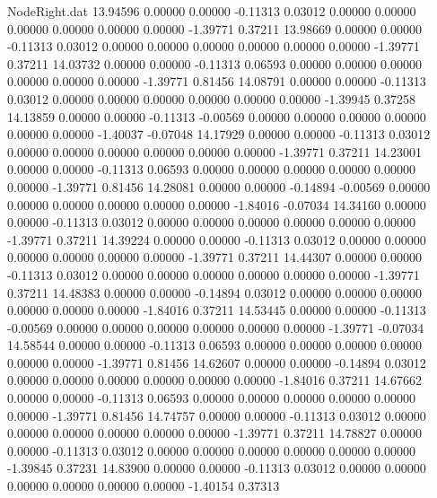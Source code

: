 \begin{filecontents}{NodeRight.dat}
  13.94596    0.00000    0.00000    -0.11313    0.03012    0.00000    0.00000    0.00000    0.00000    0.00000    0.00000   -1.39771    0.37211
  13.98669    0.00000    0.00000    -0.11313    0.03012    0.00000    0.00000    0.00000    0.00000    0.00000    0.00000   -1.39771    0.37211
  14.03732    0.00000    0.00000    -0.11313    0.06593    0.00000    0.00000    0.00000    0.00000    0.00000    0.00000   -1.39771    0.81456
  14.08791    0.00000    0.00000    -0.11313    0.03012    0.00000    0.00000    0.00000    0.00000    0.00000    0.00000   -1.39945    0.37258
  14.13859    0.00000    0.00000    -0.11313   -0.00569    0.00000    0.00000    0.00000    0.00000    0.00000    0.00000   -1.40037   -0.07048
  14.17929    0.00000    0.00000    -0.11313    0.03012    0.00000    0.00000    0.00000    0.00000    0.00000    0.00000   -1.39771    0.37211
  14.23001    0.00000    0.00000    -0.11313    0.06593    0.00000    0.00000    0.00000    0.00000    0.00000    0.00000   -1.39771    0.81456
  14.28081    0.00000    0.00000    -0.14894   -0.00569    0.00000    0.00000    0.00000    0.00000    0.00000    0.00000   -1.84016   -0.07034
  14.34160    0.00000    0.00000    -0.11313    0.03012    0.00000    0.00000    0.00000    0.00000    0.00000    0.00000   -1.39771    0.37211
  14.39224    0.00000    0.00000    -0.11313    0.03012    0.00000    0.00000    0.00000    0.00000    0.00000    0.00000   -1.39771    0.37211
  14.44307    0.00000    0.00000    -0.11313    0.03012    0.00000    0.00000    0.00000    0.00000    0.00000    0.00000   -1.39771    0.37211
  14.48383    0.00000    0.00000    -0.14894    0.03012    0.00000    0.00000    0.00000    0.00000    0.00000    0.00000   -1.84016    0.37211
  14.53445    0.00000    0.00000    -0.11313   -0.00569    0.00000    0.00000    0.00000    0.00000    0.00000    0.00000   -1.39771   -0.07034
  14.58544    0.00000    0.00000    -0.11313    0.06593    0.00000    0.00000    0.00000    0.00000    0.00000    0.00000   -1.39771    0.81456
  14.62607    0.00000    0.00000    -0.14894    0.03012    0.00000    0.00000    0.00000    0.00000    0.00000    0.00000   -1.84016    0.37211
  14.67662    0.00000    0.00000    -0.11313    0.06593    0.00000    0.00000    0.00000    0.00000    0.00000    0.00000   -1.39771    0.81456
  14.74757    0.00000    0.00000    -0.11313    0.03012    0.00000    0.00000    0.00000    0.00000    0.00000    0.00000   -1.39771    0.37211
  14.78827    0.00000    0.00000    -0.11313    0.03012    0.00000    0.00000    0.00000    0.00000    0.00000    0.00000   -1.39845    0.37231
  14.83900    0.00000    0.00000    -0.11313    0.03012    0.00000    0.00000    0.00000    0.00000    0.00000    0.00000   -1.40154    0.37313

\end{filecontents}
